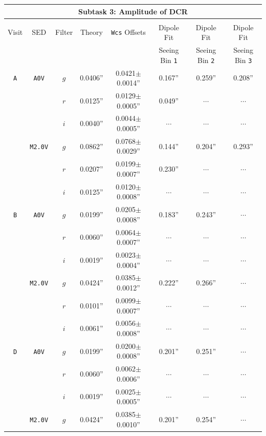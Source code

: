 \documentclass[DM,toc]{lsstdoc}
\def\A{{\tt A}}
\def\B{{\tt B}}
\def\D{{\tt D}}
\begin{document}
\begin{table}
\centering
\begin{tabular}{cccccccc}
\hline
\multicolumn{8}{|c|}{Subtask 3: Amplitude of DCR} \\ \hline \\
Visit    & SED & Filter & Theory & {\tt Wcs} Offsets & Dipole Fit         & Dipole Fit         & Dipole Fit \\
         &     &        &        &                   & Seeing Bin {\tt 1} & Seeing Bin {\tt 2} & Seeing Bin {\tt 3} \\
\hline
\A & {\tt A0V}   & $g$ & 0.0406'' & 0.0421$\pm$0.0014'' & 0.167''  & 0.259''  & 0.208''  \\
   &             & $r$ & 0.0125'' & 0.0129$\pm$0.0005'' & 0.049''  & $\cdots$ & $\cdots$ \\
   &             & $i$ & 0.0040'' & 0.0044$\pm$0.0005'' & $\cdots$ & $\cdots$ & $\cdots$ \\
   & {\tt M2.0V} & $g$ & 0.0862'' & 0.0768$\pm$0.0029'' & 0.144''  & 0.204''  & 0.293''  \\
   &             & $r$ & 0.0207'' & 0.0199$\pm$0.0007'' & 0.230''  & $\cdots$ & $\cdots$ \\
   &             & $i$ & 0.0125'' & 0.0120$\pm$0.0008'' & $\cdots$ & $\cdots$ & $\cdots$ \\
\hline
\B & {\tt A0V}   & $g$ & 0.0199'' & 0.0205$\pm$0.0008'' & 0.183''  & 0.243''  & $\cdots$ \\
   &             & $r$ & 0.0060'' & 0.0064$\pm$0.0007'' & $\cdots$ & $\cdots$ & $\cdots$ \\
   &             & $i$ & 0.0019'' & 0.0023$\pm$0.0004'' & $\cdots$ & $\cdots$ & $\cdots$ \\
   & {\tt M2.0V} & $g$ & 0.0424'' & 0.0385$\pm$0.0012'' & 0.222''  & 0.266''  & $\cdots$ \\
   &             & $r$ & 0.0101'' & 0.0099$\pm$0.0007'' & $\cdots$ & $\cdots$ & $\cdots$ \\
   &             & $i$ & 0.0061'' & 0.0056$\pm$0.0008'' & $\cdots$ & $\cdots$ & $\cdots$ \\
\hline
\D & {\tt A0V}   & $g$ & 0.0199'' & 0.0200$\pm$0.0008'' & 0.201''  & 0.251''  & $\cdots$ \\
   &             & $r$ & 0.0060'' & 0.0062$\pm$0.0006'' & $\cdots$ & $\cdots$ & $\cdots$ \\
   &             & $i$ & 0.0019'' & 0.0025$\pm$0.0005'' & $\cdots$ & $\cdots$ & $\cdots$ \\
   & {\tt M2.0V} & $g$ & 0.0424'' & 0.0385$\pm$0.0010'' & 0.201''  & 0.254''  & $\cdots$ \\

\end{tabular}
\end{table}
\end{document}
